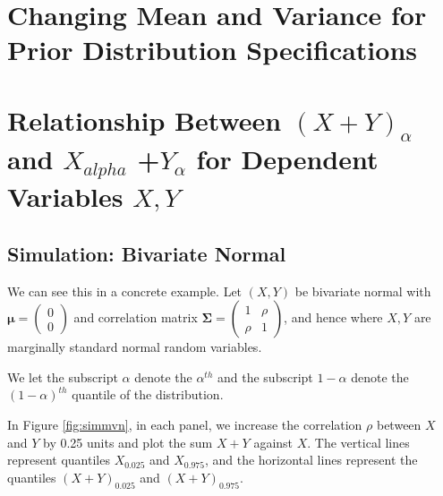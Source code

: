 \documentclass[12pt,twoside]{smiththesis}
\begin{document}
\hypertarget{changing-mean-and-variance-for-prior-distribution-specifications}{%
\section{Changing Mean and Variance for Prior Distribution Specifications}\label{changing-mean-and-variance-for-prior-distribution-specifications}}

\hypertarget{relationship-between-xy_alpha-and-x_alpha-y_alpha-for-dependent-variables-xy}{%
\section{\texorpdfstring{Relationship Between \((X+Y)_\alpha\) and \(X_{alpha}\) +\(Y_{\alpha}\) for Dependent Variables \(X,Y\)}{Relationship Between (X+Y)\_\textbackslash alpha and X\_\{alpha\} +Y\_\{\textbackslash alpha\} for Dependent Variables X,Y}}\label{relationship-between-xy_alpha-and-x_alpha-y_alpha-for-dependent-variables-xy}}

\hypertarget{simulation-bivariate-normal}{%
\subsection{Simulation: Bivariate Normal}\label{simulation-bivariate-normal}}

We can see this in a concrete example. Let \((X,Y)\) be bivariate normal with \(\boldsymbol \mu = \begin{pmatrix} 0\\0\end{pmatrix}\) and correlation matrix \(\boldsymbol \Sigma = \begin{pmatrix} 1 & \rho \\ \rho & 1 \end{pmatrix}\), and hence where \(X, Y\) are marginally standard normal random variables.

We let the subscript \(\alpha\) denote the \(\alpha^{th}\) and the subscript \(1-\alpha\) denote the \((1-\alpha)^{th}\) quantile of the distribution.

In Figure \ref{fig:simmvn}, in each panel, we increase the correlation \(\rho\) between \(X\) and \(Y\) by 0.25 units and plot the sum \(X +Y\) against \(X\). The vertical lines represent quantiles \(X_{0.025}\) and \(X_{0.975}\), and the horizontal lines represent the quantiles \((X+Y)_{0.025}\) and \((X+Y)_{0.975}\).
\end{document}
